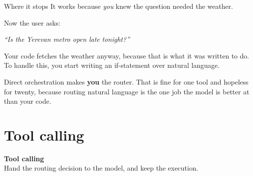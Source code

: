 \documentclass[aspectratio=169]{beamer}
\newcommand{\trapbox}[1]{%
  \begin{tcolorbox}[colback=armred!8, colframe=armred, boxrule=0.6pt, arc=2pt]
  #1
  \end{tcolorbox}}
\newcommand{\sectiontransition}[2]{%
  \begin{frame}[plain]
    \vfill
    \begin{center}
      {\Huge\bfseries\color{popblue} #1}\\[1.1em]
      {\large #2}
    \end{center}
    \vfill
  \end{frame}}
\begin{document}
\begin{frame}{Where it stops}
  \vspace{0.8em}
  It works because \emph{you} knew the question needed the weather.

  \vspace{0.9em}
  Now the user asks:

  \vspace{0.5em}
  \begin{center}
  \begin{tcolorbox}[colback=lightbg, colframe=gray, boxrule=0.5pt, arc=2pt, width=0.82\textwidth]
    \centering\textit{``Is the Yerevan metro open late tonight?''}
  \end{tcolorbox}
  \end{center}

  \vspace{0.8em}
  Your code fetches the weather anyway, because that is what it was written to do. To handle this,
  you start writing an if-statement over natural language.

  \vspace{0.7em}
  \trapbox{Direct orchestration makes \textbf{you} the router. That is fine for one tool and
  hopeless for twenty, because routing natural language is the one job the model is better at
  than your code.}
\end{frame}

\section{Tool calling}
\sectiontransition{Tool calling}{Hand the routing decision to the model, and keep the execution.}
\end{document}
